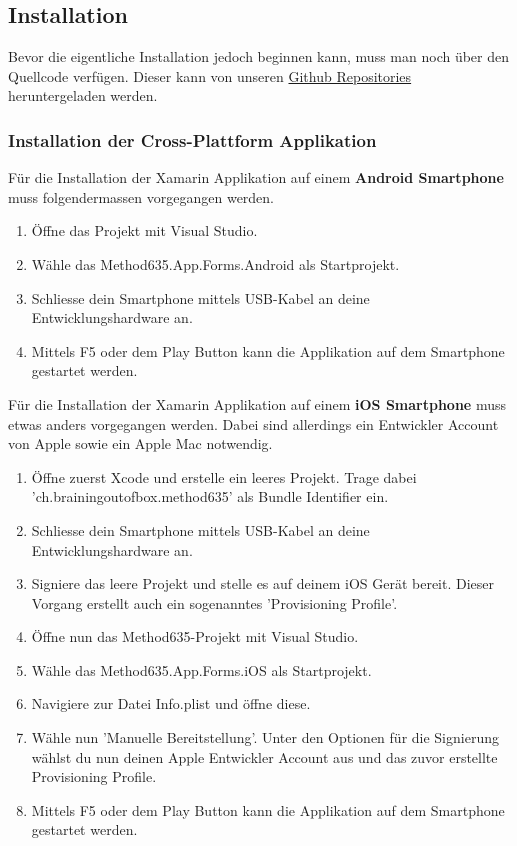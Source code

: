 \subsection{Installation}
Bevor die eigentliche Installation jedoch beginnen kann, muss man noch über den Quellcode verfügen. Dieser kann von unseren \href{https://github.com/BrainingOutOfBox}{Github Repositories} heruntergeladen werden.

\subsubsection*{Installation der Cross-Plattform Applikation}
\label{subsub:installation}
Für die Installation der Xamarin Applikation auf einem \textbf{Android Smartphone} muss folgendermassen vorgegangen werden.

\begin{enumerate}
  \item Öffne das Projekt mit Visual Studio.
  \item Wähle das \grqq Method635.App.Forms.Android \grqq als Startprojekt.
  \item Schliesse dein Smartphone mittels USB-Kabel an deine Entwicklungshardware an.
  \item Mittels F5 oder dem Play Button kann die Applikation auf dem Smartphone gestartet werden.
\end{enumerate}
Für die Installation der Xamarin Applikation auf einem \textbf{iOS Smartphone} muss etwas anders vorgegangen werden. Dabei sind allerdings ein Entwickler Account von Apple sowie ein Apple Mac notwendig.

\begin{enumerate}
  \item Öffne zuerst Xcode und erstelle ein leeres Projekt. Trage dabei 'ch.brainingoutofbox\-.method635' als Bundle Identifier ein.
  \item Schliesse dein Smartphone mittels USB-Kabel an deine Entwicklungshardware an.
  \item Signiere das leere Projekt und stelle es auf deinem iOS Gerät bereit. Dieser Vorgang erstellt auch ein sogenanntes 'Provisioning Profile'. 
  \item Öffne nun das Method635-Projekt mit Visual Studio.
  \item Wähle das \grqq Method635.App.Forms.iOS \grqq als Startprojekt.
  \item Navigiere zur Datei Info.plist und öffne diese.
  \item Wähle nun 'Manuelle Bereitstellung'. Unter den Optionen für die Signierung wählst du nun deinen Apple Entwickler Account aus und das zuvor erstellte Provisioning Profile.
  \item Mittels F5 oder dem Play Button kann die Applikation auf dem Smartphone gestartet werden. 
  \end{enumerate}


